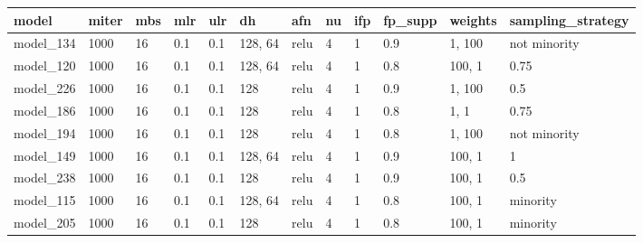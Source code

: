 \begin{tabular}{|l|l|l|l|l|l|l|l|l|l|l|l|}
\hline
\textbf{model} & \textbf{miter} & \textbf{mbs} & \textbf{mlr} & \textbf{ulr} & \textbf{dh} & \textbf{afn} & \textbf{nu} & \textbf{ifp} & \textbf{fp\_supp} & \textbf{weights} & \textbf{sampling\_strategy} \\ \hline
model\_134     & 1000           & 16           & 0.1          & 0.1          & 128, 64     & relu         & 4           & 1            & 0.9               & 1, 100           & not minority                \\ \hline
model\_120     & 1000           & 16           & 0.1          & 0.1          & 128, 64     & relu         & 4           & 1            & 0.8               & 100, 1           & 0.75                        \\ \hline
model\_226     & 1000           & 16           & 0.1          & 0.1          & 128         & relu         & 4           & 1            & 0.9               & 1, 100           & 0.5                         \\ \hline
model\_186     & 1000           & 16           & 0.1          & 0.1          & 128         & relu         & 4           & 1            & 0.8               & 1, 1             & 0.75                        \\ \hline
model\_194     & 1000           & 16           & 0.1          & 0.1          & 128         & relu         & 4           & 1            & 0.8               & 1, 100           & not minority                \\ \hline
model\_149     & 1000           & 16           & 0.1          & 0.1          & 128, 64     & relu         & 4           & 1            & 0.9               & 100, 1           & 1                           \\ \hline
model\_238     & 1000           & 16           & 0.1          & 0.1          & 128         & relu         & 4           & 1            & 0.9               & 100, 1           & 0.5                         \\ \hline
model\_115     & 1000           & 16           & 0.1          & 0.1          & 128, 64     & relu         & 4           & 1            & 0.8               & 100, 1           & minority                    \\ \hline
model\_205     & 1000           & 16           & 0.1          & 0.1          & 128         & relu         & 4           & 1            & 0.8               & 100, 1           & minority                    \\ \hline

\end{tabular}
